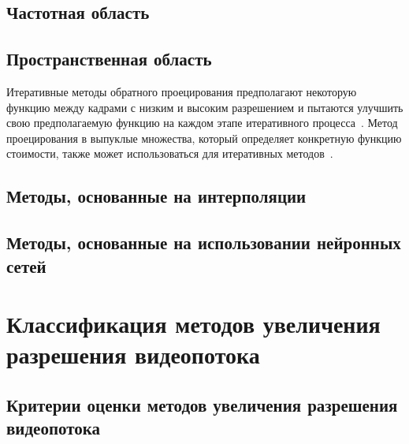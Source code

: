 \documentclass{bmstu}
\begin{document}
\section{Частотная область}

\section{Пространственная область}

Итеративные методы обратного проецирования предполагают некоторую функцию между кадрами с низким и высоким разрешением и пытаются улучшить свою предполагаемую функцию на каждом этапе итеративного процесса~\cite{Cohen2000}. 
Метод проецирования в выпуклые множества, который определяет конкретную функцию стоимости, также может использоваться для итеративных методов~\cite{Katsaggelos1997}.

\section{Методы, основанные на интерполяции}




\section{Методы, основанные на использовании нейронных сетей}

\chapter{Классификация методов увеличения разрешения видеопотока}

\section{Критерии оценки методов увеличения разрешения видеопотока}
\end{document}
